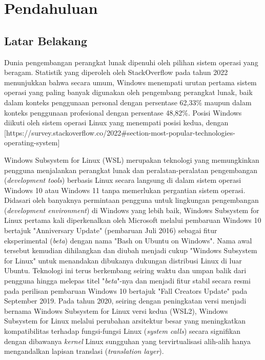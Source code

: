 \chapter{Pendahuluan}

\section{Latar Belakang}


Dunia pengembangan perangkat lunak dipenuhi oleh pilihan sistem operasi yang beragam. Statistik yang diperoleh oleh StackOverflow pada tahun 2022 menunjukkan bahwa secara umum, Windows menempati urutan pertama sistem operasi yang paling banyak digunakan oleh pengembang perangkat lunak, baik dalam konteks penggunaan personal dengan persentase 62,33\% maupun dalam konteks penggunaan profesional dengan persentase 48,82\%. Posisi Windows diikuti oleh sistem operasi Linux yang menempati posisi kedua, dengan 
[https://survey.stackoverflow.co/2022#section-most-popular-technologies-operating-system]

Windows Subsystem for Linux (WSL) merupakan teknologi yang memungkinkan pengguna menjalankan perangkat lunak dan peralatan-peralatan pengembangan (\textit{development tools}) berbasis Linux secara langsung di dalam sistem operasi Windows 10 atau Windows 11 tanpa memerlukan pergantian sistem operasi. Didasari oleh banyaknya permintaan pengguna untuk lingkungan pengembangan (\textit{development environment}) di Windows yang lebih baik, Windows Subsystem for Linux pertama kali diperkenalkan oleh Microsoft melalui pembaruan Windows 10 bertajuk "Anniversary Update" (pembaruan Juli 2016) sebagai fitur eksperimental (\textit{beta}) dengan nama "Bash on Ubuntu on Windows". Nama awal tersebut kemudian dihilangkan dan diubah menjadi cukup "Windows Subsystem for Linux" untuk menandakan dibukanya dukungan distribusi Linux di luar Ubuntu. Teknologi ini terus berkembang seiring waktu dan umpan balik dari pengguna hingga melepas titel "\textit{beta}"-nya dan menjadi fitur stabil secara resmi pada perilisan pembaruan Windows 10 bertajuk "Fall Creators Update" pada September 2019. Pada tahun 2020, seiring dengan peningkatan versi menjadi bernama Windows Subsystem for Linux versi kedua (WSL2), Windows Subsystem for Linux melalui perubahan arsitektur besar yang meningkatkan kompatibilitas terhadap fungsi-fungsi Linux (\textit{system calls}) secara signifikan dengan dibawanya \textit{kernel} Linux sungguhan yang tervirtualisasi alih-alih hanya mengandalkan lapisan translasi (\textit{translation layer}).

